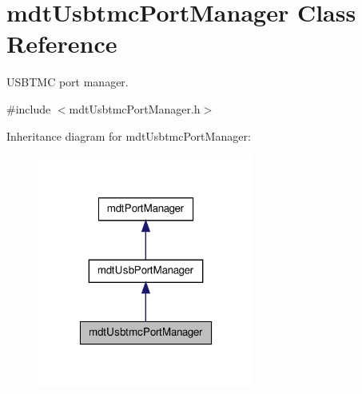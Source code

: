 \hypertarget{classmdt_usbtmc_port_manager}{
\section{mdtUsbtmcPortManager Class Reference}
\label{classmdt_usbtmc_port_manager}
}


USBTMC port manager.  




{\ttfamily \#include $<$mdtUsbtmcPortManager.h$>$}



Inheritance diagram for mdtUsbtmcPortManager:\nopagebreak
\begin{figure}[H]
\begin{center}
\leavevmode
\includegraphics[width=202pt]{classmdt_usbtmc_port_manager__inherit__graph}
\end{center}
\end{figure}


